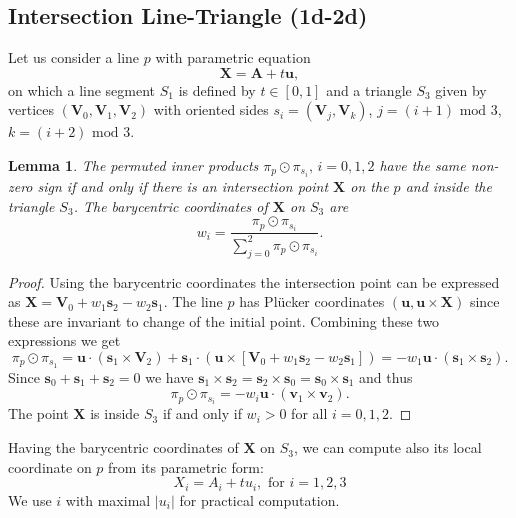\documentclass{elsarticle}
\newtheorem{lemma}[theorem]{Lemma}
\def\vc#1{\mathbf{\boldsymbol{#1}}}     %
\newcommand{\plucker}{Pl\"{u}cker }
\begin{document}
\subsection{Intersection Line-Triangle (1d-2d)}
\label{sec:1d-2d}
Let us consider a line $p$ with parametric equation 
\begin{equation}
    \label{eq:line_parametric}
    \vc X = \vc A + t\vc u,
\end{equation}
on which a line segment $S_1$ is defined by $t\in [0,1]$ and a triangle $S_3$ given by vertices $(\vc V_0, \vc V_1, \vc V_2)$ 
with oriented sides $s_i=(\vc V_j, \vc V_k)$, $j=(i+1)\text{ mod }3$, $k=(i+2)\text{ mod }3$. 
\begin{lemma}
The permuted inner products $\pi_p \odot \pi_{s_i},\, i=0,1,2$ have the same non-zero sign if and only if there
is an intersection point $\vc X$ on the $p$ and inside the triangle $S_3$. 
The barycentric coordinates of $\vc X$ on $S_3$ are
\begin{equation}
  \label{eq:bary_centric}
   w_i = \frac{\pi_p \odot \pi_{s_i}}{ \sum_{j=0}^{2} \pi_p \odot \pi_{s_i} }.
\end{equation}
\end{lemma}
\begin{proof}
Using the barycentric coordinates the intersection point can be expressed as $\vc X = \vc V_0 + w_1 \vc s_2 - w_2 \vc s_1$.
The line $p$ has \plucker coordinates $(\vc u, \vc u \times \vc X)$ since these are invariant to change of the initial point. 
Combining these two expressions we get
\[
   \pi_p \odot \pi_{s_1} = \vc u \cdot (\vc s_1 \times \vc V_2) + \vc s_1 \cdot ( \vc u \times [\vc V_0 + w_1\vc s_2 - w_2 \vc s_1])
   =-w_1 \vc u \cdot (\vc s_1 \times \vc s_2).
\]
Since $\vc s_0 + \vc s_1 + \vc s_2=0$ we have $ \vc s_1 \times \vc s_2 = \vc s_2 \times \vc s_0 = \vc s_0 \times \vc s_1$ and thus
\[
   \pi_p \odot \pi_{s_i} = -w_i \vc u \cdot (\vc v_1 \times \vc v_2).
\]
The point $\vc X$ is inside $S_3$ if and only if $w_i>0$ for all $i=0,1,2$.
\end{proof}
Having the barycentric coordinates of $\vc X$ on $S_3$, we can compute also its local coordinate on $p$ from its parametric form:
\begin{equation}
   \label{eq:line}
   X_i  = A_i + t u_i, \text{ for } i=1,2,3
\end{equation}
We use $i$ with maximal $|u_i|$ for practical computation. 
\end{document}
